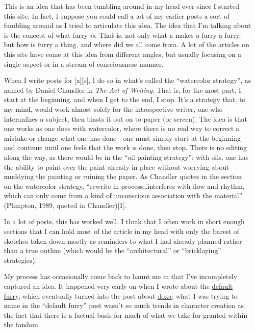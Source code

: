This is an idea that has been tumbling around in my head ever since I
started this site. In fact, I suppose you could call a lot of my earlier
posts a sort of fumbling around as I tried to articulate this idea. The
idea that I'm talking about is the concept of what furry \emph{is}. That
is, not only what a makes a furry a furry, but how is furry a thing, and
where did we all come from. A lot of the articles on this site have come
at this idea from different angles, but usually focusing on a single
aspect or in a stream-of-consciousness manner.

When I write posts for {[}a{]}{[}s{]}, I do so in what's called the
``watercolor strategy'', as named by Daniel Chandler in \emph{The Act of
Writing}. That is, for the most part, I start at the beginning, and when
I get to the end, I stop. It's a strategy that, to my mind, would work
almost solely for the introspective writer, one who internalizes a
subject, then blasts it out on to paper (or screen). The idea is that
one works as one does with watercolor, where there is no real way to
correct a mistake or change what one has done - one must simply start at
the beginning and continue until one feels that the work is done, then
stop. There is no editing along the way, as there would be in the ``oil
painting strategy''; with oils, one has the ability to paint over the
paint already in place without worrying about muddying the painting or
ruining the paper. As Chandler quotes in the section on the watercolor
strategy, ``rewrite in process\ldots{}interferes with flow and rhythm,
which can only come from a kind of unconscious association with the
material'' (Plimpton, 1989, quoted in Chandler){[}1{]}.

In a lot of posts, this has worked well. I think that I often work in
short enough sections that I can hold most of the article in my head
with only the barest of sketches taken down mostly as reminders to what
I had already planned rather than a true outline (which would be the
``architectural'' or ``bricklaying'' strategies).

My process has occasionally come back to haunt me in that I've
incompletely captured an idea. It happened very early on when I wrote
about the
\href{http://adjectivespecies.com/2011/11/09/the-default-furry/}{default
furry}, which eventually turned into the post about
\href{http://adjectivespecies.com/2012/03/14/doxa/}{doxa}: what I was
trying to name in the ``default furry'' post wasn't so much trends in
character creation as the fact that there is a factual basis for much of
what we take for granted within the fandom.

